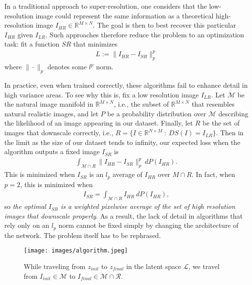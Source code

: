 \documentclass[10pt,twocolumn,letterpaper]{article}
\begin{document}
In a traditional approach to super-resolution, one considers that the low-resolution image could represent the same information as a theoretical high-resolution image $I_{HR} \in \mathbb{R}^{M \times N}$. The goal is then to best recover this particular $I_{HR}$ given $I_{LR}$. Such approaches therefore reduce the problem to an optimization task: fit a function $SR$ that minimizes
\begin{align}
    L:= \|I_{HR} - I_{SR}\|_p^p
\end{align}
where $\| \cdot \|_p$ denotes some $l^p$ norm. 

In practice, even when trained correctly, these algorithms fail to enhance detail in high variance areas. To see why this is, fix a low resolution image $I_{LR}$. Let $\mathcal{M}$ be the natural image manifold in $\mathbb{R}^{M \times N}$, i.e., the subset of $\mathbb{R}^{M \times N}$ that resembles natural realistic images, and let $P$ be a probability distribution over $\mathcal{M}$ describing the likelihood of an image appearing in our dataset. Finally, let $R$ be the set of images that downscale correctly, i.e., $R = \{I \in \mathbb{R}^{N\times M} ~:~ DS(I)=I_{LR}\}$. Then in the limit as the size of our dataset tends to infinity, our expected loss when the algorithm outputs a fixed image $I_{SR}$ is
\begin{align}
\int_{\mathcal{M} \cap R} \|I_{HR} - I_{SR}\|_p^p ~ dP(I_{HR}).
\end{align}
This is minimized when $I_{SR}$ is an $l_p$ average of $I_{HR}$ over $M \cap R$. In fact, when $p=2$, this is minimized when
\begin{align}
I_{SR} = \int_{\mathcal{M} \cap R} I_{HR} ~ dP(I_{HR}),
\end{align}
so \textit{the optimal $I_{SR}$ is a weighted pixelwise average of the set of high resolution images that downscale properly}. As a result, the lack of detail in algorithms that rely only on an $l_p$ norm cannot be fixed simply by changing the architecture of the network. The problem itself has to be rephrased.
\begin{figure}[!t]
    \centering
    \texttt{[image: images/algorithm.jpeg]}
    \caption{While traveling from $z_{init}$ to $z_{final}$ in the latent space $\mathcal{L}$, we travel from $I_{init} \in \mathcal{M}$ to $I_{final} \in \mathcal{M} \cap \mathcal{R}$.}
    \label{fig:algorithm}
\end{figure}
\end{document}
